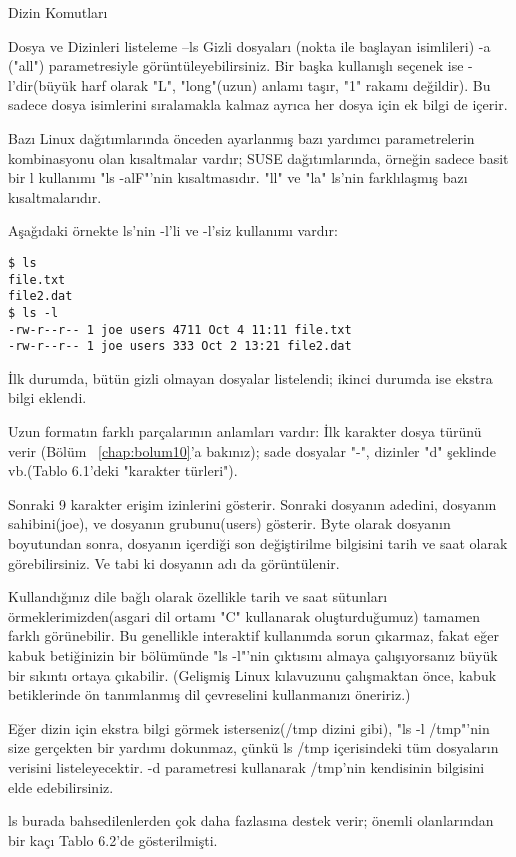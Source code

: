 \begin{section}{Dizin Komutları}
\begin{subsection}{Dosya ve Dizinleri listeleme --ls}
Gizli dosyaları (nokta ile başlayan isimlileri) -a ("all") parametresiyle görüntüleyebilirsiniz. Bir başka kullanışlı seçenek ise -l'dir(büyük harf olarak "L", "long"(uzun) anlamı taşır, "1" rakamı değildir). Bu sadece dosya isimlerini sıralamakla kalmaz ayrıca her dosya için ek bilgi de içerir.
	
Bazı Linux dağıtımlarında önceden ayarlanmış bazı yardımcı parametrelerin kombinasyonu olan kısaltmalar vardır; SUSE dağıtımlarında, örneğin sadece basit bir l kullanımı "ls -alF"'nin kısaltmasıdır. "ll" ve "la" ls'nin farklılaşmış bazı kısaltmalarıdır.
	
Aşağıdaki örnekte ls'nin -l'li ve -l'siz kullanımı vardır:
\begin{verbatim}
$ ls
file.txt
file2.dat
$ ls -l
-rw-r--r-- 1 joe users 4711 Oct 4 11:11 file.txt
-rw-r--r-- 1 joe users 333 Oct 2 13:21 file2.dat
\end{verbatim}

İlk durumda, bütün gizli olmayan dosyalar listelendi; ikinci durumda ise ekstra bilgi eklendi.

	Uzun formatın farklı parçalarının anlamları vardır: İlk karakter dosya türünü verir (Bölüm ~\ref{chap:bolum10}'a bakınız); sade dosyalar "-", dizinler "d" şeklinde vb.(Tablo 6.1'deki "karakter türleri").
	
	Sonraki 9 karakter erişim izinlerini gösterir. Sonraki dosyanın adedini, dosyanın sahibini(joe), ve dosyanın grubunu(users) gösterir. Byte olarak dosyanın boyutundan sonra, dosyanın içerdiği son değiştirilme bilgisini tarih ve saat olarak görebilirsiniz. Ve tabi ki dosyanın adı da görüntülenir.
	
	Kullandığınız dile bağlı olarak özellikle tarih ve saat sütunları örmeklerimizden(asgari dil ortamı "C" kullanarak oluşturduğumuz) tamamen farklı görünebilir. Bu genellikle interaktif kullanımda sorun çıkarmaz, fakat eğer kabuk betiğinizin bir bölümünde "ls -l"'nin çıktısını almaya çalışıyorsanız büyük bir sıkıntı ortaya çıkabilir. (Gelişmiş Linux kılavuzunu çalışmaktan önce, kabuk betiklerinde ön tanımlanmış dil çevreselini kullanmanızı öneririz.)
	
	Eğer dizin için ekstra bilgi görmek isterseniz(/tmp dizini gibi), "ls -l /tmp"'nin size gerçekten bir yardımı dokunmaz, çünkü ls /tmp içerisindeki tüm dosyaların verisini listeleyecektir. -d parametresi kullanarak /tmp'nin kendisinin bilgisini elde edebilirsiniz.
	
ls burada bahsedilenlerden çok daha fazlasına destek verir; önemli olanlarından bir kaçı Tablo 6.2'de gösterilmişti.


\end{subsection}
\end{section}
